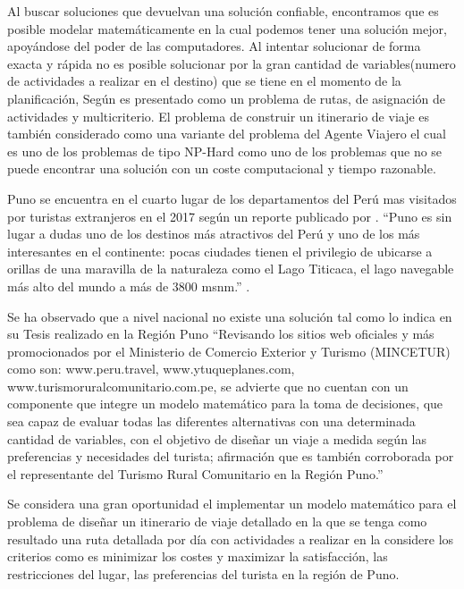 Al buscar soluciones que devuelvan una solución confiable, encontramos que es posible modelar matemáticamente en la cual podemos tener una solución mejor, apoyándose del poder de las computadores. Al intentar solucionar de forma exacta y rápida no es posible solucionar por la gran cantidad de variables(numero de actividades a realizar en el destino) que se tiene en el momento de la planificación, Según  es presentado como un problema de rutas, de asignación de actividades y multicriterio. El problema de construir un itinerario de viaje es también considerado como una variante del problema del Agente Viajero el cual es uno de los problemas de tipo NP-Hard como uno de los problemas que no se puede encontrar una solución con un coste computacional y tiempo razonable. 

Puno se encuentra en el cuarto lugar de los departamentos del Perú mas visitados por turistas extranjeros en el 2017 según un reporte publicado por .  “Puno es sin lugar a dudas uno de los destinos más atractivos del Perú y uno de los más interesantes en el continente: pocas ciudades tienen el privilegio de ubicarse a orillas de una maravilla de la naturaleza como el Lago Titicaca, el lago navegable más alto del mundo a más de 3800 msnm.”  \cite{TurismoPuno}.

Se ha observado que a nivel nacional no existe una solución tal como lo indica  en su Tesis realizado en la Región Puno “Revisando los sitios web oficiales y más promocionados por el Ministerio de Comercio Exterior y Turismo (MINCETUR) como son: www.peru.travel, www.ytuqueplanes.com, www.turismoruralcomunitario.com.pe, se advierte que no cuentan con un componente que integre un modelo matemático para la toma de decisiones, que sea capaz de evaluar todas las diferentes alternativas con una determinada cantidad de variables, con el objetivo de diseñar un viaje a medida según las preferencias y necesidades del turista; afirmación que es también corroborada por el representante del Turismo Rural Comunitario en la Región Puno.” 

Se considera una gran oportunidad el implementar un modelo matemático para el problema de diseñar un itinerario de viaje detallado en la que se tenga como resultado una ruta detallada por día con actividades a realizar en la considere los criterios como es minimizar los costes y maximizar la satisfacción, las restricciones del lugar, las preferencias del turista en la región de Puno.

